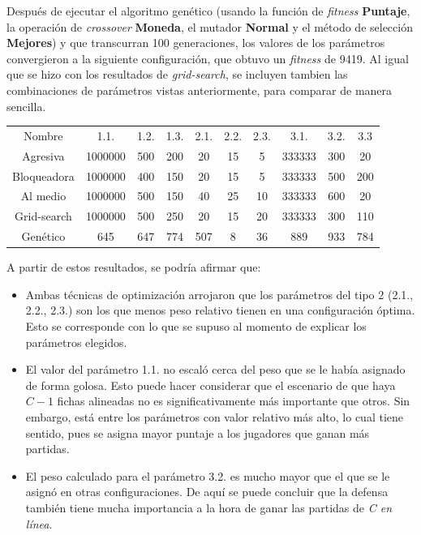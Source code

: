 \documentclass[12pt,a4paper]{article}
\begin{document}
    Después de ejecutar el algoritmo genético (usando la función de \textit{fitness} \textbf{Puntaje}, la operación de \textit{crossover} \textbf{Moneda}, el mutador \textbf{Normal} y el método de selección \textbf{Mejores})  y que transcurran 100 generaciones, los valores de los parámetros convergieron a la siguiente configuración, que obtuvo un \textit{fitness} de 9419. Al igual que se hizo con los resultados de \textit{grid-search}, se incluyen tambien las combinaciones de parámetros vistas anteriormente, para comparar de manera sencilla.
    
    \begin{center}
		\begin{tabular}{ | c || c | c | c | c | c | c | c | c | c | }
		\hline
		Nombre &  1.1. &  1.2. &  1.3. &  2.1. &  2.2. &  2.3. &  3.1. &  3.2. &  3.3 \\ \hhline{|=#=|=|=|=|=|=|=|=|=|}
		    Agresiva &  1000000 &  500 &  200 &  20 &  15 &  5 &  333333 &  300 &  20 \\ \hline
		    Bloqueadora &  1000000 &  400 &  150 &  20 &  15 &  5 &  333333 &  500 &  200 \\ \hline
		    Al medio &  1000000 &  500 &  150 &  40 &  25 &  10 &  333333 &  600 &  20 \\ \hline
		    Grid-search &  1000000 &  500 &  250 &  20 &  15 &  20 &  333333 &  300 &  110 \\ \hline
		    Genético &  645 &  647 &  774 &  507 &  8 &  36 &  889 &  933 &  784 \\ \hline
		\end{tabular}
    \end{center}
    
    A partir de estos resultados, se podría afirmar que:
        \begin{itemize}
            \item Ambas técnicas de optimización arrojaron que los parámetros del tipo 2 (2.1., 2.2., 2.3.) son los que menos peso relativo tienen en una configuración óptima. Esto se corresponde con lo que se supuso al momento de explicar los parámetros elegidos.
            \item El valor del parámetro 1.1. no escaló cerca del peso que se le había asignado de forma golosa. Esto puede hacer considerar que el escenario de que haya $C-1$ fichas alineadas no es significativamente más importante que otros. Sin embargo, está entre los parámetros con valor relativo más alto, lo cual tiene sentido, pues se asigna mayor puntaje a los jugadores que ganan más partidas.
            \item El peso calculado para el parámetro 3.2. es mucho mayor que el que se le asignó en otras configuraciones. De aquí se puede concluir que la defensa también tiene mucha importancia a la hora de ganar las partidas de \textit{C en línea}.
        \end{itemize}
    
\end{document}
